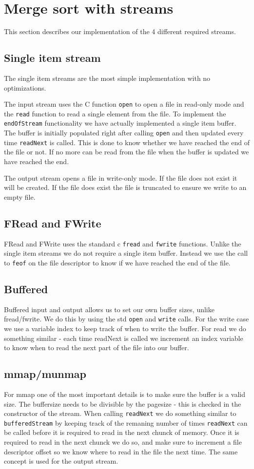 \section{Merge sort with streams}
This section describes our implementation of the 4 different required streams. 

\subsection{Single item stream}
The single item streams are the most simple implementation with no optimizations.

The input stream uses the C function \texttt{open} to open a file in read-only mode and the \texttt{read} function to read a single element from the file. To implement the \texttt{endOfStream} functionality we have actually implemented a single item buffer. The buffer is initially populated right after calling \texttt{open} and then updated every time \texttt{readNext} is called. This is done to know whether we have reached the end of the file or not. If no more can be read from the file when the buffer is updated we have reached the end.

The output stream opens a file in write-only mode. If the file does not exist it will be created. If the file does exist the file is truncated to ensure we write to an empty file.

\subsection{FRead and FWrite}
FRead and FWrite uses the standard c \texttt{fread} and \texttt{fwrite} functions. Unlike the single item streams we do not require a single item buffer. Instead we use the call to \texttt{feof} on the file descriptor to know if we have reached the end of the file. 


\subsection{Buffered}
Buffered input and output allows us to set our own buffer sizes, unlike fread/fwrite. We do this by using the std \texttt{open} and \texttt{write} calls. For the write case we use a variable index to keep track of when to write the buffer. For read we do something similar - each time readNext is called we increment an index variable to know when to read the next part of the file into our buffer.  	


\subsection{mmap/munmap}
For mmap one of the most important details is to make sure the buffer is a valid size. The buffersize needs to be divisible by the pagesize - this is checked in the constructor of the stream. When calling \texttt{readNext} we do something similar to \texttt{bufferedStream} by keeping track of the remaning number of times \texttt{readNext} can be called before it is required to read in the next chunck of memory.     
Once it is required to read in the next chunck we do so, and make sure to increment a file descriptor offset so we know where to read in the file the next time. The same concept is used for the output stream.
